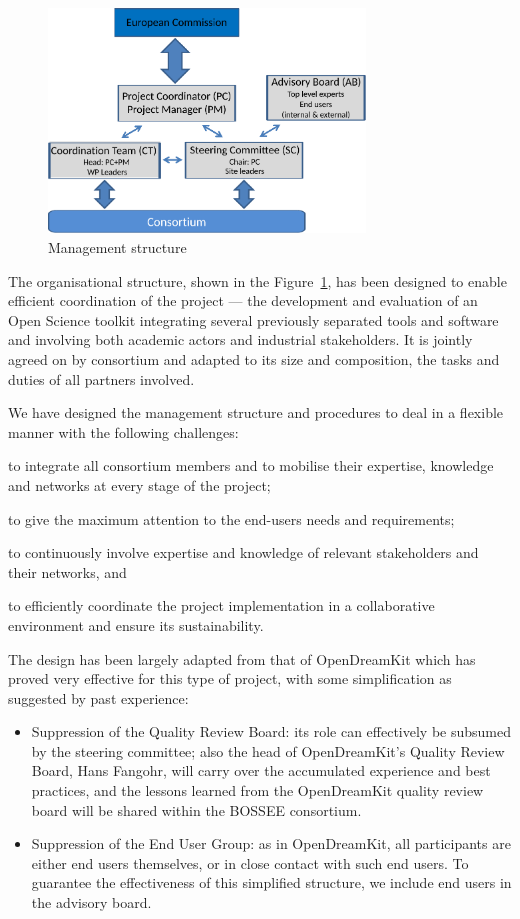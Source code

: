 \begin{figure}
  \centering
  \includegraphics[width=0.75\textwidth]{management_structure.pdf}
  \caption{Management structure}
  \label{figure.management}
\end{figure}

The organisational structure, shown in the Figure~\ref{figure.management}, has been designed
to enable efficient coordination of the project --- the
development and evaluation of an Open Science toolkit
integrating several previously separated tools and software and
involving both academic actors and industrial stakeholders. It is jointly agreed on
by \TheProject consortium and adapted to its size and composition,
the tasks and duties of all partners involved.

We have designed the management structure and procedures to deal in a
flexible manner with the following challenges:
\begin{compactitem}
\item to integrate all consortium members and to mobilise their
  expertise, knowledge and networks at every stage of the project;
\item to give the maximum attention to the end-users needs and
  requirements;
\item to continuously involve expertise and knowledge of relevant
  stakeholders and their networks, and
\item to efficiently coordinate the project implementation in a
  collaborative environment and ensure its sustainability.
\end{compactitem}

The design has been largely adapted from that of OpenDreamKit which
has proved very effective for this type of project, with some
simplification as suggested by past experience:
\begin{itemize}
\item Suppression of the Quality Review Board: its role can
  effectively be subsumed by the steering committee; also the head of
  OpenDreamKit's Quality Review Board, Hans Fangohr, will carry over
  the accumulated experience and best practices, and the lessons
  learned from the OpenDreamKit quality review board will be shared
  within the BOSSEE consortium.
\item Suppression of the End User Group: as in OpenDreamKit, all
  participants are either end users themselves, or in close contact
  with such end users. To guarantee the effectiveness of this
  simplified structure, we include end users in the advisory board.
\end{itemize}


